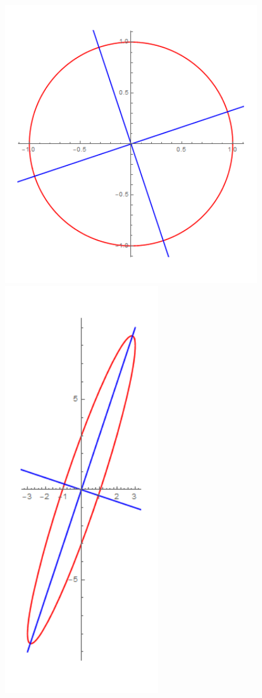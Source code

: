 \documentclass[
]{book}
\theoremstyle{definition}
\theoremstyle{definition}
\theoremstyle{definition}
\theoremstyle{definition}
\theoremstyle{remark}
\begin{document}
\begin{figure}

{\centering \includegraphics[width=5.56in,height=0.4\textheight]{img1} \includegraphics[width=2.68in,height=0.4\textheight]{img2} 

}
\end{figure}
\end{document}
